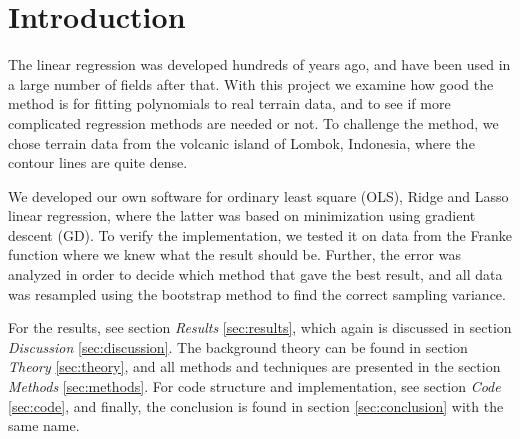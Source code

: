 \section{Introduction} \label{sec:introduction}
The linear regression was developed hundreds of years ago, and have been used in a large number of fields after that. With this project we examine how good the method is for fitting polynomials to real terrain data, and to see if more complicated regression methods are needed or not. To challenge the method, we chose terrain data from the volcanic island of Lombok, Indonesia, where the contour lines are quite dense. 

We developed our own software for ordinary least square (OLS), Ridge and Lasso linear regression, where the latter was based on minimization using gradient descent (GD). To verify the implementation, we tested it on data from the Franke function where we knew what the result should be. Further, the error was analyzed in order to decide which method that gave the best result, and all data was resampled using the bootstrap method to find the correct sampling variance. 

For the results, see section \textit{Results} \eqref{sec:results}, which again is discussed in section \textit{Discussion} \eqref{sec:discussion}. The background theory can be found in section \textit{Theory} \eqref{sec:theory}, and all methods and techniques are presented in the section \textit{Methods} \eqref{sec:methods}. For code structure and implementation, see section \textit{Code} \eqref{sec:code}, and finally, the conclusion is found in section \eqref{sec:conclusion} with the same name.